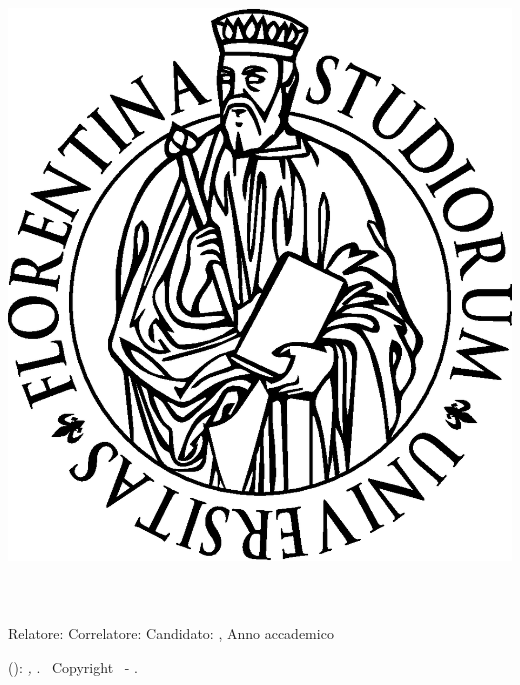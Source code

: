 \begin{titlepage}
	\begin{center}
   	\large
      \hfill
      \vfill
      \begingroup
			\spacedallcaps{\myUni} \\ 
			\myFaculty \\
			\myDegree \\ 
			\vspace{0.5cm}
         \includegraphics[width=.25\textwidth]{logo/logoUnifi.eps}\\
         \vspace{0.5cm}    
      \endgroup 
      \vfill 
      \begingroup
      	\color{Maroon}\spacedallcaps{\myTitle} \\ \bigskip
      \endgroup
      \begingroup
      	\small\color{Maroon}\spacedallcaps{\mySubtitle} \\ \bigskip
      \endgroup
      \mySubsubtitle\\
      \vfill
      Relatore: {\itshape\myProf}\hfill Correlatore: {\itshape\mySupervisor}
      \vfill  
      Candidato: \spacedlowsmallcaps{\myName}
      \vfill
      {\itshape\myMonth \myYear}, Anno accademico {\itshape\myAcademicYear}
      \vfill                      
	\end{center}        
\end{titlepage}   
   \newpage
	\thispagestyle{empty}
	\hfill
	\vfill
	\noindent\myName(\texttt{\myMail}): 
	\textit{\myTitle,} 
	\myDegree. \textcopyright\ Copyright \myYear \myName\ - \mycopyright.

